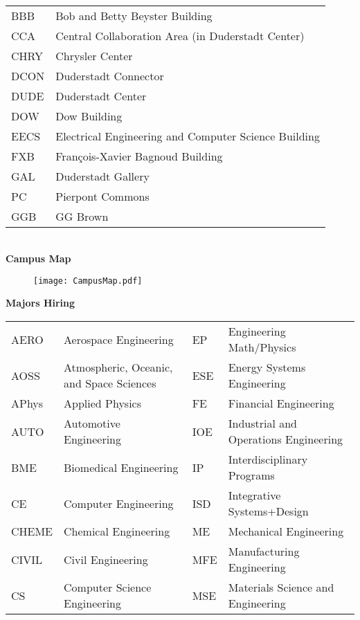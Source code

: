 { \fontsize{10}{12}\\
\begin{tabular}{p{1in}l}
BBB	&	Bob and Betty Beyster Building\\
CCA	&	Central Collaboration Area (in Duderstadt Center)\\
CHRY	&	Chrysler Center\\
DCON	&	Duderstadt Connector\\
DUDE	&	Duderstadt Center\\
DOW	&	Dow Building\\
EECS	&	Electrical Engineering and Computer Science Building\\
FXB	&	Fran\c{c}ois-Xavier Bagnoud Building\\
GAL	&	Duderstadt Gallery\\
PC	&	Pierpont Commons\\
GGB & GG Brown\\
\end{tabular}\\
{ \fontsize{20}{24}\selectfont \bf Campus Map}\\
\vspace{-1cm}
\begin{figure}[H]
\centering
\texttt{[image: CampusMap.pdf]}
\end{figure}
{ \fontsize{20}{24}\selectfont \bf Majors Hiring}\\
\begin{tabular}{p{.5in}p{2.55in}p{.5in}p{2.9in}}
AERO & Aerospace Engineering&		EP & Engineering Math/Physics\\
AOSS & Atmospheric, Oceanic, and Space Sciences&		ESE & Energy Systems Engineering\\
APhys & Applied Physics &FE&Financial Engineering\\
AUTO& Automotive Engineering& 	IOE&Industrial and Operations Engineering\\
BME&	Biomedical Engineering&		IP&Interdisciplinary Programs\\
CE & Computer Engineering&		 ISD & Integrative Systems+Design\\
CHEME & Chemical Engineering& 		ME&Mechanical Engineering\\
CIVIL & Civil Engineering& 			MFE&Manufacturing Engineering\\
CS & Computer Science Engineering&	MSE&Materials Science and Engineering\\

\end{tabular}}
